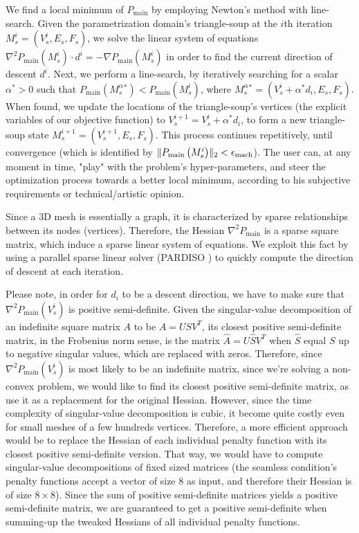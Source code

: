 \noindent We find a local minimum of $P_{\mathrm{main}}$ by employing Newton's method with line-search. Given the parametrization domain's triangle-soup at the $i$th iteration $M_s^i = \left(V_s^i, E_s, F_s\right)$, we solve the linear system of equations $\nabla^2 P_{\mathrm{main}}\left(M_s^i\right) \cdot d^i = -\nabla P_{\mathrm{main}}\left(M_s^i\right)$ in order to find the current direction of descent $d^i$. Next, we perform a line-search, by iteratively searching for a scalar $\alpha^* > 0$ such that $P_{\mathrm{main}}\left(M_s^\alpha^*\right) < P_{\mathrm{main}}\left(M_s^i\right)$, where $M_s^\alpha^* = \left(V_s^i + \alpha^* d_i, E_s, F_s\right)$. When found, we update the locations of the triangle-soup's vertices (the explicit variables of our objective function) to $V_s^{i+1} = V_s^i + \alpha^* d_i$, to form a new triangle-soup state $M_s^{i+1} = \left(V_s^{i+1}, E_s, F_s\right)$. This process continues repetitively, until convergence (which is identified by $\lVert P_{\mathrm{main}}\left(M_s^i\right)\rVert_2 < \epsilon_{\mathrm{mach}}$). The user can, at any moment in time, "play" with the problem's hyper-parameters, and steer the optimization process towards a better local minimum, according to his subjective requirements or technical/artistic opinion.

\noindent Since a 3D mesh is essentially a graph, it is characterized by sparse relationships between its nodes (vertices). Therefore, the Hessian $\nabla^2 P_{\mathrm{main}}$ is a sparse square matrix, which induce a sparse linear system of equations. We exploit this fact by using a parallel sparse linear solver (PARDISO \cite{SCHENK200169}) to quickly compute the direction of descent at each iteration.

\noindent Please note, in order for $d_i$ to be a descent direction, we have to make sure that $\nabla^2 P_{\mathrm{main}}\left(V_s^i\right)$ is positive semi-definite. Given the singular-value decomposition of an indefinite square matrix $A$ to be $A = USV^T$, its closest positive semi-definite matrix, in the Frobenius norm sense, is the matrix $\hat{A} = U\hat{S}V^T$ when $\hat{S}$ equal $S$ up to negative singular values, which are replaced with zeros. Therefore, since $\nabla^2 P_{\mathrm{main}}\left(V_s^i\right)$ is most likely to be an indefinite matrix, since we're solving a non-convex problem, we would like to find its closest positive semi-definite matrix, as use it as a replacement for the original Hessian. However, since the time complexity of singular-value decomposition is cubic, it become quite costly even for small meshes of a few hundreds vertices. Therefore, a more efficient approach would be to replace the Hessian of each individual penalty function with its closest positive semi-definite version. That way, we would have to compute singular-value decompositions of fixed sized matrices (the seamless condition's penalty functions accept a vector of size 8 as input, and therefore their Hessian is of size $8 \times 8$). Since the sum of positive semi-definite matrices yields a positive semi-definite matrix, we are guaranteed to get a positive semi-definite when summing-up the tweaked Hessians of all individual penalty functions.
